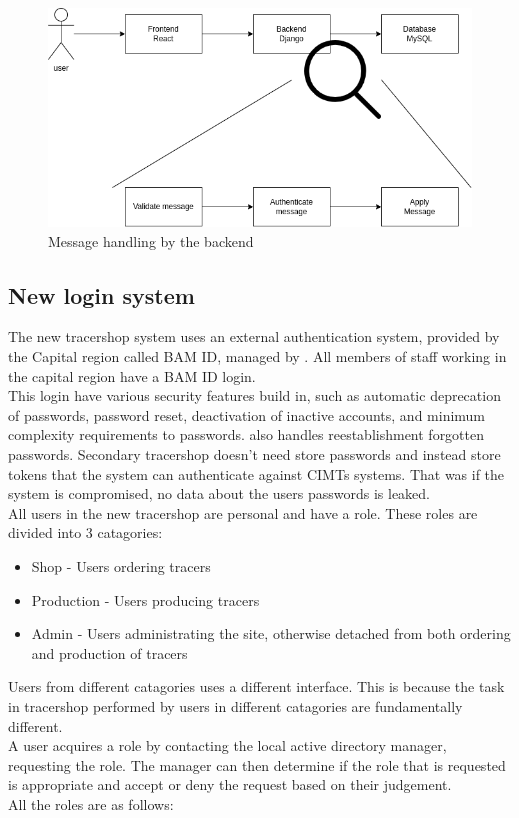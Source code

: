 \documentclass{article}
\begin{document}
\begin{figure}[ht]
  \begin{center}
    \includegraphics[width=0.6\linewidth]{MessageHandeling.png}
    \caption{Message handling by the backend}
    \label{fig:messageHandle}
  \end{center}
\end{figure}

\subsection*{New login system}

The new tracershop system uses an external authentication system, provided by the Capital region called BAM ID, managed by . All members of staff working in the capital region have a BAM ID login.\\
This login have various security features build in, such as automatic deprecation of passwords, password reset, deactivation of inactive accounts, and minimum complexity requirements to passwords.  also handles reestablishment forgotten passwords.
Secondary tracershop doesn't need store passwords and instead store tokens that the system can authenticate against CIMTs systems. That was if the system is compromised, no data about the users passwords is leaked.\\
All users in the new tracershop are personal and have a role. These roles are divided into 3 catagories:

\begin{itemize}
  \item Shop - Users ordering tracers
  \item Production - Users producing tracers
  \item Admin - Users administrating the site, otherwise detached from both ordering and production of tracers
\end{itemize}

Users from different catagories uses a different interface. This is because the task in tracershop performed by users in different catagories are fundamentally different.\\
A user acquires a role by contacting the local active directory manager, requesting the role. The manager can then determine if the role that is requested is appropriate and accept or deny the request based on their judgement.\\
All the roles are as follows:
\end{document}
